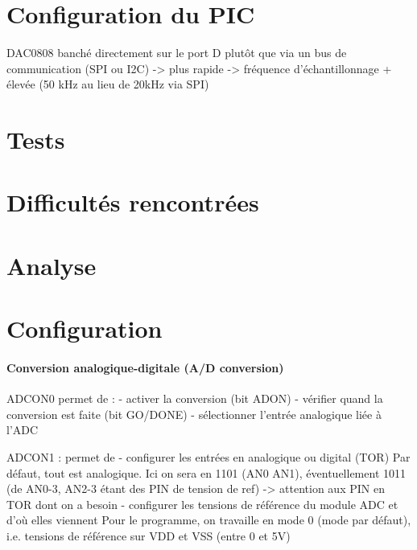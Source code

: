 \documentclass{article}
\begin{document}
    \section{Configuration du PIC}
    DAC0808 banché directement sur le port D plutôt que via un bus de communication (SPI ou I2C) -> plus rapide -> fréquence d'échantillonnage + élevée (50 kHz au lieu de 20kHz via SPI)

    \section{Tests}

    \section{Difficultés rencontrées}

    









    \section{Analyse}
    \paragraph{}
    

    

    \section{Configuration}
    \paragraph{Conversion analogique-digitale (A/D conversion)}
    ADCON0 permet de :
    - activer la conversion (bit ADON)
    - vérifier quand la conversion est faite (bit GO/DONE)
    - sélectionner l'entrée analogique liée à l'ADC

    ADCON1 :
    permet de
    - configurer les entrées en analogique ou digital (TOR)
    Par défaut, tout est analogique. Ici on sera en 1101 (AN0 AN1), éventuellement 1011 (de AN0-3, AN2-3 étant des PIN de tension de ref) -> attention aux PIN en TOR dont on a besoin
    - configurer les tensions de référence du module ADC et d'où elles viennent
    Pour le programme, on travaille en mode 0 (mode par défaut), i.e. tensions de référence sur VDD et VSS (entre 0 et 5V)
\end{document}
